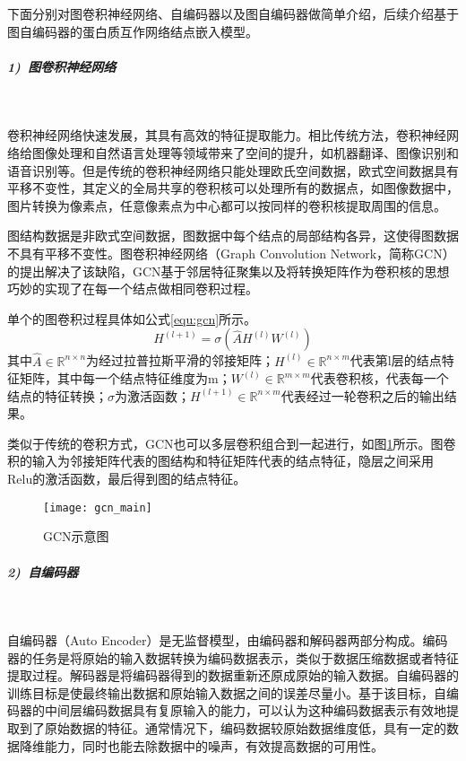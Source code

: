 下面分别对图卷积神经网络、自编码器以及图自编码器做简单介绍，后续介绍基于图自编码器的蛋白质互作网络结点嵌入模型。

\subparagraph{1)~图卷积神经网络} ~

卷积神经网络快速发展，其具有高效的特征提取能力。相比传统方法，卷积神经网络给图像处理和自然语言处理等领域带来了空间的提升，如机器翻译、图像识别和语音识别等。但是传统的卷积神经网络只能处理欧氏空间数据，欧式空间数据具有平移不变性，其定义的全局共享的卷积核可以处理所有的数据点，如图像数据中，图片转换为像素点，任意像素点为中心都可以按同样的卷积核提取周围的信息。

图结构数据是非欧式空间数据，图数据中每个结点的局部结构各异，这使得图数据不具有平移不变性。图卷积神经网络（Graph Convolution Network，简称GCN）的提出\cite{kipf_semi-supervised_2017}解决了该缺陷，GCN基于邻居特征聚集以及将转换矩阵作为卷积核的思想巧妙的实现了在每一个结点做相同卷积过程。

单个的图卷积过程具体如公式\ref{equ:gcn}所示。
\begin{equation}
    \label{equ:gcn}
    H^{(l+1)}=\sigma (\hat{A}H^{(l)}W^{(l)})
\end{equation}
其中$\hat{A}\in \mathbb{R}^{n\times n} $为经过拉普拉斯平滑的邻接矩阵；$H^{(l)}\in \mathbb{R}^{n\times m} $代表第l层的结点特征矩阵，其中每一个结点特征维度为m；$W^{(l)}\in \mathbb{R}^{m\times m} $代表卷积核，代表每一个结点的特征转换；$\sigma $为激活函数；$H^{(l+1)}\in \mathbb{R}^{n\times m} $代表经过一轮卷积之后的输出结果。

类似于传统的卷积方式，GCN也可以多层卷积组合到一起进行，如图\ref{fig:gcn_main}所示。图卷积的输入为邻接矩阵代表的图结构和特征矩阵代表的结点特征，隐层之间采用Relu的激活函数，最后得到图的结点特征。

\begin{figure}[htbp]
    \centering
    \texttt{[image: gcn\_main]}
    \caption{GCN示意图\cite{wu_comprehensive_2020}}
    \label{fig:gcn_main}
\end{figure}

\subparagraph{2)~自编码器} ~

自编码器（Auto Encoder）是无监督模型，由编码器和解码器两部分构成。编码器的任务是将原始的输入数据转换为编码数据表示，类似于数据压缩数据或者特征提取过程。解码器是将编码器得到的数据重新还原成原始的输入数据。自编码器的训练目标是使最终输出数据和原始输入数据之间的误差尽量小。基于该目标，自编码器的中间层编码数据具有复原输入的能力，可以认为这种编码数据表示有效地提取到了原始数据的特征。通常情况下，编码数据较原始数据维度低，具有一定的数据降维能力，同时也能去除数据中的噪声，有效提高数据的可用性。

